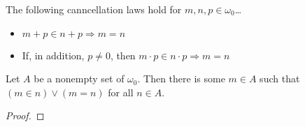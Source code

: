\begin{corollary}
The following canncellation laws hold for $m,n,p \in \omega_0$\dots
\begin{itemize}
  \item $m + p \in n + p \Rightarrow m = n$
  \item If, in addition, $p \neq 0$, then $m \cdot p \in n \cdot p \Rightarrow m = n$
\end{itemize}
\end{corollary}

\begin{theorem}\label{wellorderingofnaturalnumbers}
Let $A$ be a nonempty set of $\omega_0.$ Then there is some $m \in A$ such that $(m \in n) \lor (m=n)$ for all $n \in A$.
\end{theorem}

\begin{proof}

\end{proof}
